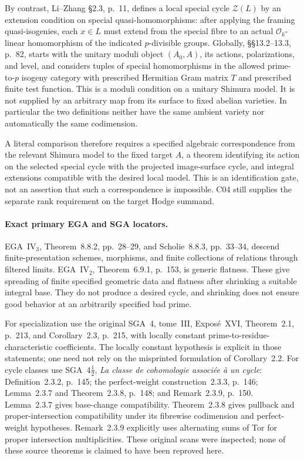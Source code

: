 \documentclass[11pt]{article}
\theoremstyle{definition}\newtheorem{definition}[theorem]{Definition}\newtheorem{remark}[theorem]{Remark}
\begin{document}
By contrast, Li--Zhang \S2.3, p.~11, defines a local special cycle
$\mathcal Z(L)$ by an extension condition on special
quasi-homomorphisms: after applying the framing quasi-isogenies,
each $x\in L$ must extend from the special fibre to an actual
$\mathcal O_k$-linear homomorphism of the indicated
$p$-divisible groups. Globally, \S\S13.2--13.3, p.~82, starts
with the unitary moduli object $(A_0,A)$, its actions,
polarizations, and level, and considers tuples of special
homomorphisms in the allowed prime-to-$p$ isogeny category with
prescribed Hermitian Gram matrix $T$ and prescribed finite test
function. This is a moduli condition on a unitary Shimura model.
It is not supplied by an arbitrary map from its surface to fixed
abelian varieties. In particular the two definitions neither have
the same ambient variety nor automatically the same codimension.

A literal comparison therefore requires a specified algebraic
correspondence from the relevant Shimura model to the fixed target
$A$, a theorem identifying its action on the selected special cycle
with the projected image-surface cycle, and integral extensions
compatible with the desired local model. This is an identification
gate, not an assertion that such a correspondence is impossible.
C04 still supplies the separate rank requirement on the target
Hodge summand.

\paragraph{Exact primary EGA and SGA locators.}
EGA~IV$_3$, Theorem~8.8.2, pp.~28--29, and Scholie~8.8.3,
pp.~33--34, descend finite-presentation schemes, morphisms, and
finite collections of relations through filtered limits.
EGA~IV$_2$, Theorem~6.9.1, p.~153, is generic flatness. These give
spreading of finite specified geometric data and flatness after
shrinking a suitable integral base. They do not produce a desired
cycle, and shrinking does not ensure good behavior at an arbitrarily
specified bad prime.

For specialization use the original SGA~4, tome~III,
Expos\'e~XVI, Theorem~2.1, p.~213, and Corollary~2.3, p.~215,
with locally constant prime-to-residue-characteristic coefficients.
The locally constant hypothesis is explicit in those statements;
one need not rely on the misprinted formulation of Corollary~2.2.
For cycle classes use SGA~4$\frac12$, \emph{La classe de cohomologie
associ\'ee \`a un cycle}: Definition~2.3.2, p.~145;
the perfect-weight construction~2.3.3, p.~146;
Lemma~2.3.7 and Theorem~2.3.8, p.~148; and
Remark~2.3.9, p.~150. Lemma~2.3.7 gives base-change compatibility.
Theorem~2.3.8 gives pullback and proper-intersection compatibility
under its fibrewise codimension and perfect-weight hypotheses.
Remark~2.3.9 explicitly uses alternating sums of Tor for proper
intersection multiplicities. These original scans were inspected;
none of these source theorems is claimed to have been reproved here.
\end{document}
